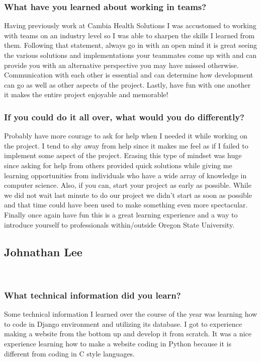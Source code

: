 \subsubsection{What have you learned about working in teams?}
\noindent Having previously work at Cambia Health Solutions I was accustomed to working with teams on an industry level so I was able to sharpen the skills I learned from them. Following that statement, always go in with an open mind it is great seeing the various solutions and implementations your teammates come up with and can provide you with an alternative perspective you may have missed otherwise. Communication with each other is essential and can determine how development can go as well as other aspects of the project. Lastly, have fun with one another it makes the entire project enjoyable and memorable!\\

\subsubsection{If you could do it all over, what would you do differently?}
\noindent Probably have more courage to ask for help when I needed it while working on the project. I tend to shy away from help since it makes me feel as if I failed to implement some aspect of the project. Erasing this type of mindset was huge since asking for help from others provided quick solutions while giving me learning opportunities from individuals who have a wide array of knowledge in computer science. Also, if you can, start your project as early as possible. While we did not wait last minute to do our project we didn't start as soon as possible and that time could have been used to make something even more spectacular. Finally once again have fun this is a great learning experience and a way to introduce yourself to professionals within/outside Oregon State University.\\

\subsection{Johnathan Lee}\\

\subsubsection{What technical information did you learn?}
\noindent Some technical information I learned over the course of the year was learning how to code in Django environment and utilizing its database. I got to experience making a website from the bottom up and develop it from scratch. It was a nice experience learning how to make a website coding in Python because it is different from coding in C style languages.\\

